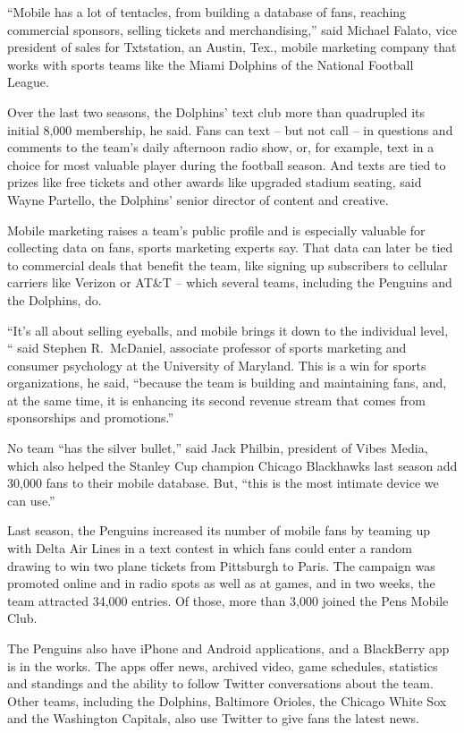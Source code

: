 ﻿\documentclass[12pt]{article}
\begin{document}
``Mobile has a lot of tentacles, from building a database of fans, reaching commercial sponsors,
selling tickets and merchandising,'' said Michael Falato, vice president of sales for Txtstation, an
Austin, Tex., mobile marketing company that works with sports teams like the Miami Dolphins of the
National Football League.

Over the last two seasons, the Dolphins' text club more than quadrupled its initial 8,000
membership, he said. Fans can text -- but not call -- in questions and comments to the team's daily
afternoon radio show, or, for example, text in a choice for most valuable player during the football
season. And texts are tied to prizes like free tickets and other awards like upgraded stadium
seating, said Wayne Partello, the Dolphins' senior director of content and creative.

Mobile marketing raises a team's public profile and is especially valuable for collecting data on
fans, sports marketing experts say. That data can later be tied to commercial deals that benefit the
team, like signing up subscribers to cellular carriers like Verizon or AT\&T -- which several teams,
including the Penguins and the Dolphins, do.

``It's all about selling eyeballs, and mobile brings it down to the individual level, `` said
Stephen R.~McDaniel, associate professor of sports marketing and consumer psychology at the
University of Maryland. This is a win for sports organizations, he said, ``because the team is
building and maintaining fans, and, at the same time, it is enhancing its second revenue stream that
comes from sponsorships and promotions.''

No team ``has the silver bullet,'' said Jack Philbin, president of Vibes Media, which also helped
the Stanley Cup champion Chicago Blackhawks last season add 30,000 fans to their mobile database.
But, ``this is the most intimate device we can use.''

Last season, the Penguins increased its number of mobile fans by teaming up with Delta Air Lines in
a text contest in which fans could enter a random drawing to win two plane tickets from Pittsburgh
to Paris. The campaign was promoted online and in radio spots as well as at games, and in two weeks,
the team attracted 34,000 entries. Of those, more than 3,000 joined the Pens Mobile Club.

The Penguins also have iPhone and Android applications, and a BlackBerry app is in the works. The
apps offer news, archived video, game schedules, statistics and standings and the ability to follow
Twitter conversations about the team. Other teams, including the Dolphins, Baltimore Orioles, the
Chicago White Sox and the Washington Capitals, also use Twitter to give fans the latest news.
\end{document}
